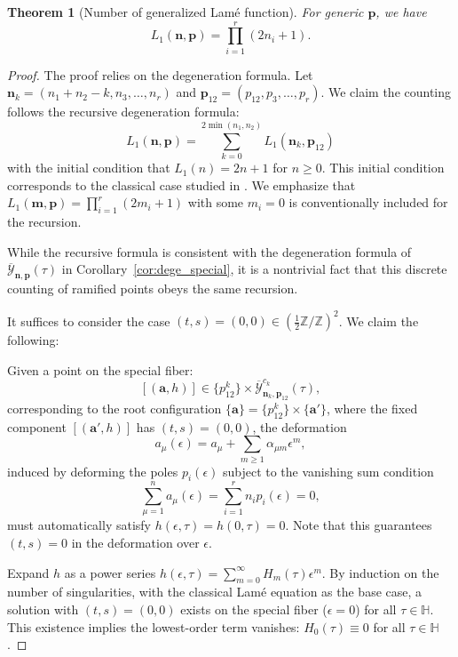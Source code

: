 \documentclass[11pt]{amsart}
\newtheorem{theorem}{Theorem}[section]
\theoremstyle{remark}
\numberwithin{equation}{section}
\begin{document}
\begin{theorem}[Number of generalized Lam\'e function] \label{t:GLF} 
For generic $\mathbf{p}$, we have 
\[
    L_1(\mathbf{n},\mathbf{p}) = \prod_{i=1}^r (2n_i +1).
\]
\end{theorem}
\begin{proof}
The proof relies on the degeneration formula. Let $\mathbf{n}_k = (n_1+n_2-k,n_3,\dots,n_r)$ and $\mathbf{p}_{12} = (p_{12},p_3,\dots,p_r)$. 
We claim the counting follows the recursive degeneration formula:
\[
    L_1(\mathbf{n},\mathbf{p}) = \sum_{k=0}^{2\min (n_1,n_2)} L_1(\mathbf{n}_k,\mathbf{p}_{12})
\]
with the initial condition that $L_1(n) = 2n+1$ for $n \geq 0$. This initial condition corresponds to the classical case studied in \cite{Chai_Lin_Wang_2015}. We emphasize that $L_1(\mathbf{m},\mathbf{p}) = \prod_{i=1}^r(2m_i +1)$ with some $m_i =0$ is conventionally included for the recursion.      

While the recursive formula is consistent with the degeneration formula of $\overline{\mathcal{Y}}_{\mathbf{n},\mathbf{p}}(\tau)$ in Corollary~\ref{cor:dege_special}, it is a nontrivial fact that this discrete counting of ramified points obeys the same recursion.

It suffices to consider the case $(t,s) = (0,0) \in ( \frac{1}{2}\mathbb{Z}/\mathbb{Z} )^2 $. We claim the following:

Given a point on the special fiber:
\[
    [(\mathbf{a}, h)] \in \{p_{12}^k\} \times \overline{\mathcal{Y}}_{\mathbf{n}_k,\mathbf{p}_{12}}^{c_k}(\tau),
\]
corresponding to the root configuration $\{ \mathbf{a} \} = \{p_{12}^k\} \times \{\mathbf{a}'\}$, where the fixed component $[(\mathbf{a}', h)]$ has $(t,s) = (0,0)$, the deformation 
\[
    a_\mu(\epsilon) = a_\mu + \sum_{m \geq 1} \alpha_{\mu m} \epsilon^m,
\]
induced by deforming the poles $p_i(\epsilon)$ subject to the vanishing sum condition 
\[
    \sum_{\mu=1}^n a_\mu(\epsilon) = \sum_{i=1}^r n_i p_i(\epsilon) = 0,
\]
must automatically satisfy $h(\epsilon,\tau) = h(0,\tau) = 0$. Note that this guarantees $(t,s) = 0$ in the deformation over $\epsilon$.

Expand $h$ as a power series $h(\epsilon, \tau) = \sum_{m=0}^\infty H_m(\tau) \epsilon^m$. By induction on the number of singularities, with the classical Lam\'e equation as the base case, a solution with $(t,s) = (0,0)$ exists on the special fiber ($\epsilon=0$) for all $\tau \in \mathbb{H}$. This existence implies the lowest-order term vanishes: $H_0(\tau) \equiv 0$ for all $\tau \in \mathbb{H}$.


\end{proof}
\end{document}
